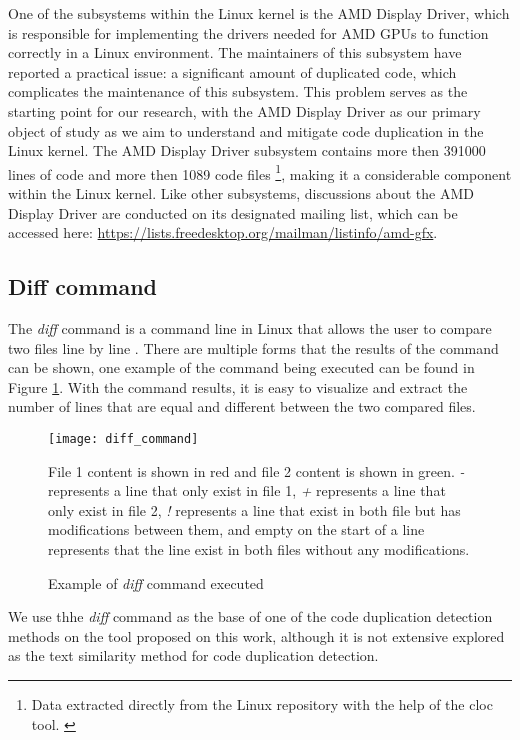 One of the subsystems within the Linux kernel is the AMD Display Driver, which
is responsible for implementing the drivers needed for AMD GPUs to function
correctly in a Linux environment. The maintainers of this subsystem have
reported a practical issue: a significant amount of duplicated code, which
complicates the maintenance of this subsystem. This problem serves as the
starting point for our research, with the AMD Display Driver as our primary
object of study as we aim to understand and mitigate code duplication in the
Linux kernel. The AMD Display Driver subsystem contains more then 391000 lines 
of code and more then 1089 code files
\footnote{ 
Data extracted directly from the Linux repository with the help of the cloc tool.
\citep{cloc}
}, 
making it a considerable component within the Linux kernel. Like other 
subsystems, discussions about the AMD Display Driver are conducted on its 
designated mailing list, which can be accessed here: 
\url{https://lists.freedesktop.org/mailman/listinfo/amd-gfx}.



\subsection{Diff command}

The \textit{diff} command is a command line in Linux that allows the user to compare 
two files line by line \citep{diffcommand}. There are multiple forms 
that the results of the command can be shown, one example of the command being executed 
can be found in Figure \ref{fig:diff}. With the command results, it is easy to visualize and extract 
the number of lines that are equal and different between the two compared files.


\begin{figure}
\texttt{[image: diff\_command]}
\caption{Example of \textit{diff} command executed}
File 1 content is shown in red and file 2 content is shown in green. \textit{-} 
represents a line that only exist in file 1, \textit{+} represents a line that only exist in file 2,
\textit{!} represents a line that exist in both file but has modifications between them, and empty on the
start of a line represents that the line exist in both files without any modifications.
\label{fig:diff}
\end{figure}

We use thhe \textit{diff} command as the base of one of the code duplication detection methods 
on the tool proposed on this work, although it is not extensive explored as the text similarity
method for code duplication detection.

